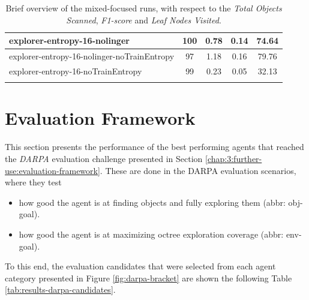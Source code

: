 \begin{longtable}{|l|c|c|c|c|}
explorer-entropy-16-nolinger & 100 & {\cellcolor[HTML]{B9DAD3}} \color[HTML]{000000} 0.78 & {\cellcolor[HTML]{EBF2F0}} \color[HTML]{000000} 0.14 & {\cellcolor[HTML]{CCE3DE}} \color[HTML]{000000} 74.64 \\ \hline
explorer-entropy-16-nolinger-noTrainEntropy & 97 & {\cellcolor[HTML]{97CABF}} \color[HTML]{000000} 1.18 & {\cellcolor[HTML]{EBF2F0}} \color[HTML]{000000} 0.16 & {\cellcolor[HTML]{CAE2DD}} \color[HTML]{000000} 79.76 \\ \hline
explorer-entropy-16-noTrainEntropy & 99 & {\cellcolor[HTML]{E7F0EE}} \color[HTML]{000000} 0.23 & {\cellcolor[HTML]{EBF2F0}} \color[HTML]{000000} 0.05 & {\cellcolor[HTML]{DEECE9}} \color[HTML]{000000} 32.13 \\ \hline

    \caption{Brief overview of the mixed-focused runs, with respect to the \textit{Total Objects Scanned}, \textit{F1-score} and \textit{Leaf Nodes Visited}.}
    \label{tab:results-mixed-agents}
\end{longtable}





\section{Evaluation Framework}
This section presents the performance of the best performing agents that reached the \textit{DARPA} evaluation challenge presented in Section \ref{chap:3:further-use:evaluation-framework}. 
These are done in the DARPA evaluation scenarios, where they test
\begin{itemize}
    \item how good the agent is at finding objects and fully exploring them (abbr: obj-goal).
    \item how good the agent is at maximizing octree exploration coverage (abbr: env-goal).
\end{itemize}

% 

To this end, the evaluation candidates that were selected from each agent category presented in Figure \ref{fig:darpa-bracket} are shown the following Table \ref{tab:results-darpa-candidates}. 

